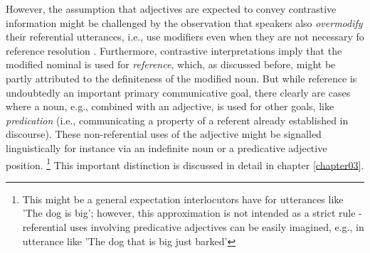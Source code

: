 However, the assumption that adjectives are expected to convey contrastive information might be challenged by the observation that speakers also \textit{overmodify} their referential utterances, i.e., use modifiers even when they are not necessary fo reference resolution \parencite{degen2020redundancy}.  Furthermore, contrastive interpretations imply that the modified nominal is used for \textit{reference}, which, as discussed before, might be partly attributed to the definiteness of the modified noun. But while reference is undoubtedly an important primary communicative goal, there clearly are cases where a noun, e.g., combined with an adjective, is used for other goals, like \textit{predication} (i.e., communicating a property of a referent already established in discourse). These non-referential uses of the adjective might be signalled linguistically for instance via an indefinite noun or a predicative adjective position. \footnote{This might be a general expectation interlocutors have for utterances like 'The dog is big'; however, this approximation is not intended as a strict rule - referential uses involving predicative adjectives can be easily imagined, e.g., in utterance like 'The dog that is big just barked'}   %
This important distinction is discussed in detail in chapter \ref{chapter03}.  

